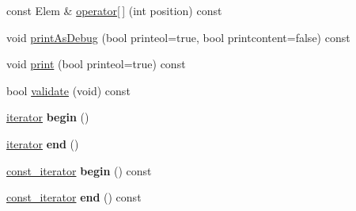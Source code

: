 \begin{DoxyCompactItemize}
\item 
const Elem \& \hyperlink{classnsMyDblLinkList_1_1MyDblLinkList_a4ae1525359a5e499fda037f3a4ca3a08}{operator\mbox{[}$\,$\mbox{]}} (int position) const 
\item 
void \hyperlink{classnsMyDblLinkList_1_1MyDblLinkList_ae3e7df9c2643abe23a65a126d7e2174d}{print\-As\-Debug} (bool printeol=true, bool printcontent=false) const 
\item 
void \hyperlink{classnsMyDblLinkList_1_1MyDblLinkList_aaae80104b6b658008805cd3af410118a}{print} (bool printeol=true) const 
\item 
bool \hyperlink{classnsMyDblLinkList_1_1MyDblLinkList_a46ffecf0dc73999031da0b647cc17070}{validate} (void) const 
\item 
\hypertarget{classnsMyDblLinkList_1_1MyDblLinkList_a29a66301f515cc4deead1cc52be736ba}{\hyperlink{classnsMyDblLinkList_1_1MyDblLinkList_1_1iterator}{iterator} {\bfseries begin} ()}\label{classnsMyDblLinkList_1_1MyDblLinkList_a29a66301f515cc4deead1cc52be736ba}

\item 
\hypertarget{classnsMyDblLinkList_1_1MyDblLinkList_a16f416cf7e3e6b3efaabed7854ddd3af}{\hyperlink{classnsMyDblLinkList_1_1MyDblLinkList_1_1iterator}{iterator} {\bfseries end} ()}\label{classnsMyDblLinkList_1_1MyDblLinkList_a16f416cf7e3e6b3efaabed7854ddd3af}

\item 
\hypertarget{classnsMyDblLinkList_1_1MyDblLinkList_ab29e90f0b3aab8621ba2b5011314ee3a}{\hyperlink{classnsMyDblLinkList_1_1MyDblLinkList_1_1const__iterator}{const\-\_\-iterator} {\bfseries begin} () const }\label{classnsMyDblLinkList_1_1MyDblLinkList_ab29e90f0b3aab8621ba2b5011314ee3a}

\item 
\hypertarget{classnsMyDblLinkList_1_1MyDblLinkList_a72cbf109f49ed6cd0bd289b292bce75f}{\hyperlink{classnsMyDblLinkList_1_1MyDblLinkList_1_1const__iterator}{const\-\_\-iterator} {\bfseries end} () const }\label{classnsMyDblLinkList_1_1MyDblLinkList_a72cbf109f49ed6cd0bd289b292bce75f}

\end{DoxyCompactItemize}


